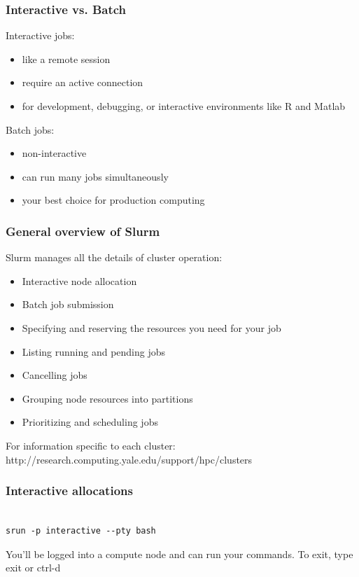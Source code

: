 \documentclass[10pt]{beamer}
\begin{document}
\begin{frame}[fragile]
\frametitle{Interactive vs. Batch}

Interactive jobs:
\begin{itemize}
\item like a remote session
\item require an active connection
\item for development, debugging, or 
interactive environments like R and Matlab 
\end{itemize}
\vskip10pt

Batch jobs:
\begin{itemize}
\item non-interactive  
\item can run many jobs simultaneously
\item your best choice for production computing
\end{itemize}
\end{frame}

\begin{frame}[fragile]
\frametitle{General overview of Slurm}

Slurm manages all the details of cluster operation:
\begin{itemize}
\item Interactive node allocation
\item Batch job submission
\item Specifying and reserving the resources you need for your job
\item Listing running and pending jobs
\item Cancelling jobs
\item Grouping node resources into partitions
\item Prioritizing and scheduling jobs
\end{itemize}

For information specific to each cluster:
http://research.computing.yale.edu/support/hpc/clusters

\end{frame}

\begin{frame}[fragile]
\frametitle{Interactive allocations}

\begin{verbatim}

srun -p interactive --pty bash

\end{verbatim}

You'll be logged into a compute node and can run your commands. 
\vspace{0.1in}
To exit, type exit or ctrl-d

\end{frame}
\end{document}
